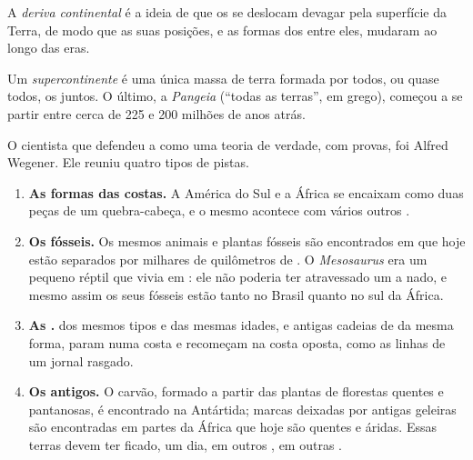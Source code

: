 \begin{definition}\label{def:g7:plate-tectonics:continental-drift}
A \emph{deriva continental} é a ideia de que os
 se deslocam devagar pela superfície da Terra, de modo que as
suas posições, e as formas dos  entre eles, mudaram ao longo das
eras.
\end{definition}

\begin{definition}[Supercontinente]\label{def:g7:plate-tectonics:supercontinent}
Um \emph{supercontinente} é uma única massa de terra
formada por todos, ou quase todos, os  juntos. O último, a
\emph{Pangeia} (``todas as terras'', em grego), começou a se
partir entre cerca de 225 e 200 milhões de anos atrás.
\end{definition}

O cientista que defendeu a  como uma teoria de verdade,
com provas, foi Alfred Wegener. Ele reuniu quatro tipos de pistas.

\begin{enumerate}
  \item \textbf{As formas das costas.} A América do Sul e a África se
        encaixam como duas peças de um quebra-cabeça, e o mesmo acontece
        com vários outros .
  \item \textbf{Os fósseis.} Os mesmos animais e plantas fósseis são
        encontrados em  que hoje estão separados por milhares de
        quilômetros de . O \emph{Mesosaurus} era um pequeno réptil que
        vivia em : ele não poderia ter atravessado um  a
        nado, e mesmo assim os seus fósseis estão tanto no Brasil quanto no
        sul da África.
  \item \textbf{As .}  dos mesmos tipos e das mesmas idades, e
        antigas cadeias de  da mesma forma, param numa costa e
        recomeçam na costa oposta, como as linhas de um jornal rasgado.
  \item \textbf{Os  antigos.} O carvão, formado a partir das plantas
        de florestas quentes e pantanosas, é encontrado na Antártida; marcas
        deixadas por antigas geleiras são encontradas em partes da África
        que hoje são quentes e áridas. Essas terras devem ter ficado, um dia,
        em outros , em outras .
\end{enumerate}

